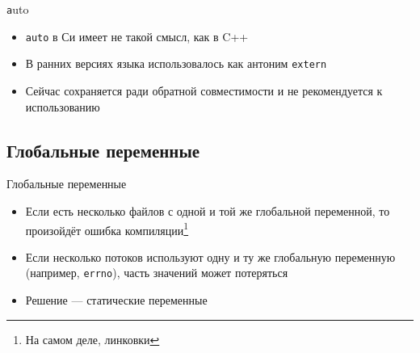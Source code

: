 \documentclass[handout]{beamer}
\begin{document}
\begin{frame}{\texttt auto}
	\begin{itemize}
		\item{\texttt{auto} в Си имеет не такой смысл, как в C++}\pause
		\item{В ранних версиях языка использовалось как антоним \texttt{extern}}\pause
		\item{Сейчас сохраняется ради обратной совместимости и не рекомендуется к использованию}
	\end{itemize}
\end{frame}

\subsection{Глобальные переменные}
\begin{frame}{Глобальные переменные}
	\begin{itemize}
		\item{Если есть несколько файлов с одной и той же глобальной переменной, то произойдёт ошибка компиляции\footnote{На самом деле, линковки}}\pause
		\item{Если несколько потоков используют одну и ту же глобальную переменную (например, \texttt{errno}), часть значений может потеряться}\pause
		\item{Решение --- статические переменные}
	\end{itemize}
\end{frame}
	
\end{document}
